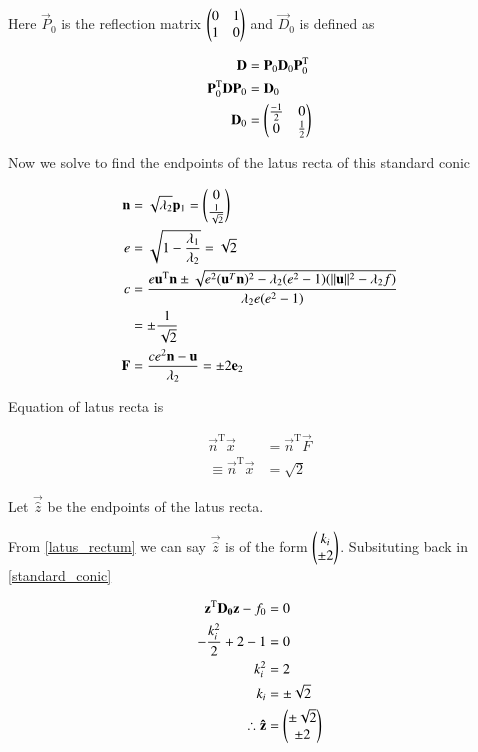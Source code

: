 \documentclass[journal]{IEEEtran}
\begin{document}
Here $\vec{P}_0$ is the reflection matrix $\begin{pmatrix}0 & 1 \\ 1 & 0\end{pmatrix}$ and $\vec{D}_0$ is defined as 

\begin{align}
	\mathbf{D} &= \mathbf{P}_0\mathbf{D}_0\mathbf{P}_0^\text{T}\\
	\mathbf{P}_0^\text{T}\mathbf{D}\mathbf{P}_0 &= \mathbf{D}_0\\
	\mathbf{D}_0 &= \begin{pmatrix}\frac{-1}{2} & 0 \\ 0 & \frac{1}{2}\end{pmatrix}
\end{align}

Now we solve to find the endpoints of the latus recta of this standard conic

\begin{align}
	\mathbf{n} &= \sqrt{\lambda_2}\mathbf{p}_1 = \begin{pmatrix}0 \\ \frac{1}{\sqrt{2}}\end{pmatrix}\\
	e &= \sqrt{1 - \frac{\lambda_1}{\lambda_2}} = \sqrt{2}\\
	c &= \dfrac{e\mathbf{u}^\text{T}\mathbf{n} \pm \sqrt{e^2 (\mathbf{u}^T \mathbf{n})^2 - \lambda_2(e^2 - 1)(\Vert \mathbf{u} \Vert^2-\lambda_2f)}}{\lambda_2e(e^2 - 1)}\\
	&= \pm \frac{1}{\sqrt{2}}\\
	\mathbf{F} &= \dfrac{ce^2\mathbf{n}-\mathbf{u}}{\lambda_2} = \pm 2 \mathbf{e}_2\\
\end{align}

Equation of latus recta is

\begin{align}
	\vec{n}^\text{T}\vec{x} &= \vec{n}^\text{T}\vec{F}\\
	\equiv \vec{n}^\text{T}\vec{x} &= \sqrt{2} \label{latus_rectum} 
\end{align}

Let $\vec{\hat{z}}$ be the endpoints of the latus recta.

From \eqref{latus_rectum} we can say $\vec{\hat{z}}$ is of the form $\begin{pmatrix}k_i \\ \pm2\end{pmatrix}$. Subsituting back in \eqref{standard_conic}

\begin{align}
	\mathbf{z}^\text{T}\mathbf{D_0}\mathbf{z} - f_0 &= 0\\
	-\frac{k_i^2}{2} + 2 - 1 &= 0\\
	k_i^2 &= 2\\
	k_i &= \pm \sqrt{2}\\
	\therefore \mathbf{\hat{z}} &= \begin{pmatrix}\pm \sqrt{2} \\ \pm 2\end{pmatrix}
\end{align}
\end{document}
